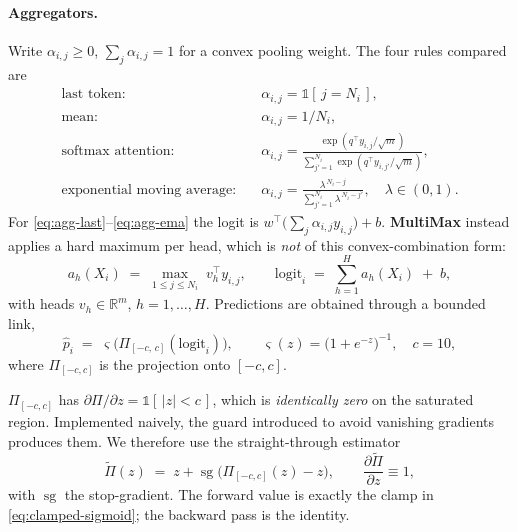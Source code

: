\paragraph{Aggregators.} Write $\alpha_{i,j}\ge 0$, $\sum_{j}\alpha_{i,j}=1$ for a
convex pooling weight. The four rules compared are
%
\begin{align}
  \text{last token:}\quad
    &\alpha_{i,j}=\mathbb{1}[\,j=N_i\,], \label{eq:agg-last}\\[2pt]
  \text{mean:}\quad
    &\alpha_{i,j}=1/N_i, \label{eq:agg-mean}\\[2pt]
  \text{softmax attention:}\quad
    &\alpha_{i,j}=\frac{\exp(q^\top y_{i,j}/\sqrt{m})}
                       {\sum_{j'=1}^{N_i}\exp(q^\top y_{i,j'}/\sqrt{m})},
    \label{eq:agg-softmax}\\[2pt]
  \text{exponential moving average:}\quad
    &\alpha_{i,j}=\frac{\lambda^{\,N_i-j}}{\sum_{j'=1}^{N_i}\lambda^{\,N_i-j'}},
     \quad \lambda\in(0,1). \label{eq:agg-ema}
\end{align}
%
For \eqref{eq:agg-last}--\eqref{eq:agg-ema} the logit is $w^\top\!\big(\sum_j
\alpha_{i,j}y_{i,j}\big)+b$. \textbf{MultiMax} instead applies a hard maximum
per head, which is \emph{not} of this convex-combination form:
%
\begin{equation}
  \boxed{\;
  a_h(X_i) \;=\; \max_{1\le j\le N_i}\; v_h^\top y_{i,j},
  \qquad
  \mathrm{logit}_i \;=\; \sum_{h=1}^{H} a_h(X_i) \;+\; b,
  \;}
  \label{eq:multimax}
\end{equation}
with heads $v_h\in\mathbb{R}^{m}$, $h=1,\dots,H$. Predictions are obtained through a
bounded link,
%
\begin{equation}
  \hat p_i \;=\; \varsigma\!\big(\Pi_{[-c,\,c]}(\mathrm{logit}_i)\big),
  \qquad \varsigma(z)=\big(1+e^{-z}\big)^{-1},\quad c=10,
  \label{eq:clamped-sigmoid}
\end{equation}
where $\Pi_{[-c,c]}$ is the projection onto $[-c,c]$.

\begin{remark}
\label{rem:clamp}
$\Pi_{[-c,c]}$ has $\partial\Pi/\partial z=\mathbb{1}[\,|z|<c\,]$, which is
\emph{identically zero} on the saturated region. Implemented naively, the guard
introduced to avoid vanishing gradients produces them. We therefore use the
straight-through estimator
%
\begin{equation}
  \widetilde\Pi(z)\;=\;z+\operatorname{sg}\!\big(\Pi_{[-c,c]}(z)-z\big),
  \qquad
  \frac{\partial\widetilde\Pi}{\partial z}\equiv 1,
  \label{eq:straight-through}
\end{equation}
with $\operatorname{sg}$ the stop-gradient. The forward value is exactly the clamp in
\eqref{eq:clamped-sigmoid}; the backward pass is the identity.
\end{remark}



